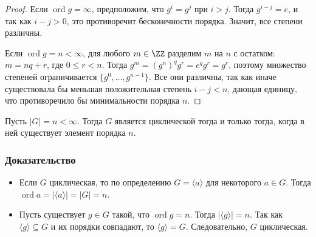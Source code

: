 \begin{proof}
	Если $\operatorname{ord} g = \infty$, предположим, что $g^i = g^j$ при $i > j$. Тогда $g^{i-j} = e$, и так как $i-j > 0$, это противоречит бесконечности порядка. Значит, все степени различны.

	Если $\operatorname{ord} g = n < \infty$, для любого $m \in \ZZ$ разделим $m$ на $n$ с остатком: $m = nq + r$, где $0 \le r < n$. Тогда $g^m = (g^n)^q g^r = e^q g^r = g^r$, поэтому множество степеней ограничивается $\{g^0,\dots,g^{n-1}\}$. Все они различны, так как иначе существовала бы меньшая положительная степень $i-j < n$, дающая единицу, что противоречило бы минимальности порядка $n$.
\end{proof}

\begin{Proposition}{}{}
	Пусть $|G| = n < \infty$. Тогда $G$ является циклической тогда и только тогда, когда в ней существует элемент порядка $n$.
\end{Proposition}

\subsubsection*{Доказательство}

\begin{itemize}
	\item[$\Rightarrow$)] Если $G$ циклическая, то по определению $G = \langle a \rangle$ для некоторого $a \in G$. Тогда $\operatorname{ord} a = |\langle a \rangle| = |G| = n.$
	
	\item[$\Leftarrow$)] Пусть существует $g \in G$ такой, что $\operatorname{ord} g = n$. Тогда $|\langle g \rangle| = n.$
	Так как $\langle g \rangle \subseteq G$ и их порядки совпадают, то $\langle g \rangle = G.$
	Следовательно, $G$ циклическая.
\end{itemize}
